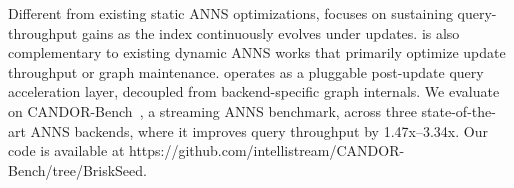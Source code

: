 Different from existing static ANNS optimizations, \system focuses on sustaining query-throughput gains as the index continuously evolves under updates. \system is also complementary to existing dynamic ANNS works \cite{Singh2021,Liu20252268,Voruganti2025} that primarily optimize update throughput or graph maintenance. \system operates as a pluggable post-update query acceleration layer, decoupled from backend-specific graph internals. We evaluate \system on CANDOR-Bench~\cite{Wang202627}, a streaming ANNS benchmark, across three state-of-the-art ANNS backends, where it improves query throughput by 1.47x--3.34x. Our code is available at https://github.com/intellistream/CANDOR-Bench/tree/BriskSeed.




